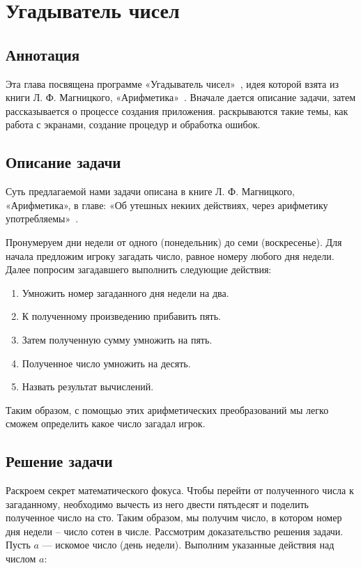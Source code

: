 \chapter{Угадыватель чисел}
\label{ch:guessnumbers}

\section{Аннотация} 

Эта глава посвящена программе «Угадыватель чисел»~\cite{PanfilovaApp}, идея которой взята из книги Л. Ф. Магницкого, «Арифметика»~\cite{Galanin}. Вначале дается описание задачи, затем рассказывается о процессе создания приложения. раскрываются такие темы, как работа с экранами, создание процедур и обработка ошибок.


\section{Описание задачи}

Суть предлагаемой нами задачи описана в книге Л. Ф. Магницкого, «Арифметика», в главе: «Об утешных некиих действиях, через арифметику употребляемы»~\cite{Galanin}.

Пронумеруем дни недели от одного (понедельник) до семи (воскресенье). Для начала предложим игроку загадать число, равное номеру любого дня недели. Далее попросим загадавшего выполнить следующие действия:
\begin{enumerate}
\item Умножить номер загаданного дня недели на два.
\item К полученному произведению прибавить пять.
\item Затем полученную сумму умножить на пять.
\item Полученное число умножить на десять.
\item Назвать результат вычислений.
\end{enumerate}

Таким образом, с помощью этих арифметических преобразований мы легко сможем определить какое число загадал игрок.

\section{Решение задачи}

Раскроем секрет математического фокуса. Чтобы перейти от полученного числа к загаданному, необходимо вычесть из него двести пятьдесят и поделить полученное число на сто. Таким образом, мы получим число, в котором номер дня недели – число сотен в числе. Рассмотрим доказательство решения задачи. Пусть $ a $ — искомое число (день недели). Выполним указанные действия над числом $ a $:

